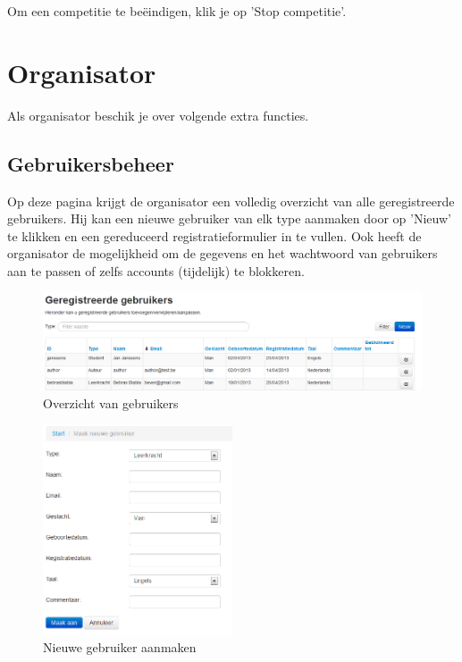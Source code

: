 \documentclass[]{article}
\begin{document}
Om een competitie te beëindigen, klik je op 'Stop competitie'.

\section{Organisator}

Als organisator beschik je over volgende extra functies.

\subsection{Gebruikersbeheer}
Op deze pagina krijgt de organisator een volledig overzicht van alle geregistreerde gebruikers. Hij kan een nieuwe gebruiker van elk type aanmaken door op 'Nieuw' te klikken en een gereduceerd registratieformulier in te vullen. Ook heeft de organisator de mogelijkheid om de gegevens en het wachtwoord van gebruikers aan te passen of zelfs accounts (tijdelijk) te blokkeren. 

\begin{figure}[!ht]
	\centering
	\includegraphics[width=1\textwidth]{img/usermgmt}
	\caption{Overzicht van gebruikers}
	\label{usermgmt}
\end{figure}

\begin{figure}[!ht]
	\centering
	\includegraphics[width=0.5\textwidth]{img/create_user}
	\caption{Nieuwe gebruiker aanmaken}
	\label{create_user}
\end{figure}
\end{document}
